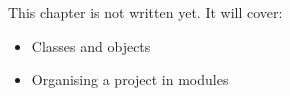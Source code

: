 \label{ch:py4}
\begin{keyidea}
This chapter is not written yet. It will cover:
\begin{itemize}[nosep]
  \item Classes and objects
  \item Organising a project in modules
\end{itemize}
\end{keyidea}
